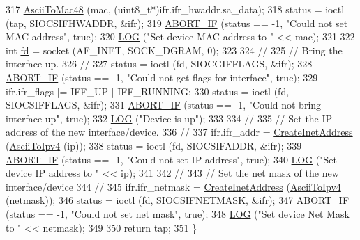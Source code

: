 \begin{DoxyCode}
317   \hyperlink{tap-creator_8cc_aeb9510b65095fe530be572d2261f72f7}{AsciiToMac48} (mac, (uint8\_t*)ifr.ifr\_hwaddr.sa\_data);
318   status = ioctl (tap, SIOCSIFHWADDR, &ifr);
319   \hyperlink{tap-creator_8cc_a91c11c90ad2f1672fbd3c031038dce16}{ABORT\_IF} (status == -1, \textcolor{stringliteral}{"Could not set MAC address"}, \textcolor{keyword}{true});
320   \hyperlink{tap-creator_8cc_a158a8c64f24645c7478298399825737f}{LOG} (\textcolor{stringliteral}{"Set device MAC address to "} << mac);
321 
322   \textcolor{keywordtype}{int} \hyperlink{lte_2model_2fading-traces_2fading__trace__generator_8m_a44f21d5190b5a6df8089f54799628d7e}{fd} = socket (AF\_INET, SOCK\_DGRAM, 0);
323 
324   \textcolor{comment}{//}
325   \textcolor{comment}{// Bring the interface up.}
326   \textcolor{comment}{//}
327   status = ioctl (fd, SIOCGIFFLAGS, &ifr);
328   \hyperlink{tap-creator_8cc_a91c11c90ad2f1672fbd3c031038dce16}{ABORT\_IF} (status == -1, \textcolor{stringliteral}{"Could not get flags for interface"}, \textcolor{keyword}{true});
329   ifr.ifr\_flags |= IFF\_UP | IFF\_RUNNING;
330   status = ioctl (fd, SIOCSIFFLAGS, &ifr);
331   \hyperlink{tap-creator_8cc_a91c11c90ad2f1672fbd3c031038dce16}{ABORT\_IF} (status == -1, \textcolor{stringliteral}{"Could not bring interface up"}, \textcolor{keyword}{true});
332   \hyperlink{tap-creator_8cc_a158a8c64f24645c7478298399825737f}{LOG} (\textcolor{stringliteral}{"Device is up"});
333 
334   \textcolor{comment}{//}
335   \textcolor{comment}{// Set the IP address of the new interface/device.}
336   \textcolor{comment}{//}
337   ifr.ifr\_addr = \hyperlink{tap-creator_8cc_a47df9fd87752509424a35340e868acd1}{CreateInetAddress} (\hyperlink{tap-creator_8cc_ac1b8e624182192ac85e3e35876d6e152}{AsciiToIpv4} (ip));
338   status = ioctl (fd, SIOCSIFADDR, &ifr);
339   \hyperlink{tap-creator_8cc_a91c11c90ad2f1672fbd3c031038dce16}{ABORT\_IF} (status == -1, \textcolor{stringliteral}{"Could not set IP address"}, \textcolor{keyword}{true});
340   \hyperlink{tap-creator_8cc_a158a8c64f24645c7478298399825737f}{LOG} (\textcolor{stringliteral}{"Set device IP address to "} << ip);
341 
342   \textcolor{comment}{//}
343   \textcolor{comment}{// Set the net mask of the new interface/device}
344   \textcolor{comment}{//}
345   ifr.ifr\_netmask = \hyperlink{tap-creator_8cc_a47df9fd87752509424a35340e868acd1}{CreateInetAddress} (\hyperlink{tap-creator_8cc_ac1b8e624182192ac85e3e35876d6e152}{AsciiToIpv4} (netmask));
346   status = ioctl (fd, SIOCSIFNETMASK, &ifr);
347   \hyperlink{tap-creator_8cc_a91c11c90ad2f1672fbd3c031038dce16}{ABORT\_IF} (status == -1, \textcolor{stringliteral}{"Could not set net mask"}, \textcolor{keyword}{true});
348   \hyperlink{tap-creator_8cc_a158a8c64f24645c7478298399825737f}{LOG} (\textcolor{stringliteral}{"Set device Net Mask to "} << netmask);
349 
350   \textcolor{keywordflow}{return} tap;
351 \}
\end{DoxyCode}


